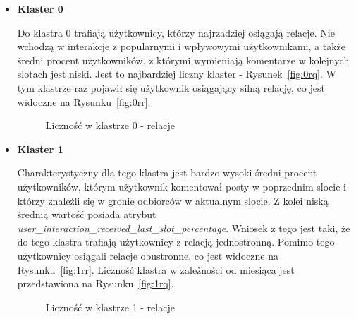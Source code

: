\documentclass[polish,12pt]{aghthesis}
\begin{document}
\begin{itemize}
    \item \textbf{Klaster 0}
    
    Do klastra 0 trafiają użytkownicy, którzy najrzadziej osiągają relacje. Nie wchodzą w interakcje z popularnymi i wpływowymi użytkownikami, a także średni procent użytkowników, z którymi wymieniają komentarze w kolejnych slotach jest niski. Jest to najbardziej liczny klaster - Rysunek~\ref{fig:0rq}. W tym klastrze raz pojawił się użytkownik osiągający silną relację, co jest widoczne na Rysunku~\ref{fig:0rr}.
    
            \begin{figure}[ht] 
    \centering
    \hfill%
    \caption{Liczność w klastrze 0 - relacje}
    \label{f:0r}
    \end{figure}
    

\item \textbf{Klaster 1}

Charakterystyczny dla tego klastra jest bardzo wysoki średni procent użytkowników, którym użytkownik komentował posty w poprzednim slocie i którzy znaleźli się w gronie odbiorców w aktualnym slocie. Z kolei niską średnią wartość posiada atrybut \textit{user\_interaction\_received\_last\_slot\_percentage}. Wniosek z tego jest taki, że do tego klastra trafiają użytkownicy z relacją jednostronną. Pomimo tego użytkownicy osiągali relacje obustronne, co jest widoczne na Rysunku~\ref{fig:1rr}. Liczność klastra w zależności od miesiąca jest przedstawiona na Rysunku~\ref{fig:1rq}.

            \begin{figure}[ht] 
    \centering
    \hfill%
    \caption{Liczność w klastrze 1 - relacje}
    \label{f:1r}
    \end{figure}




\end{itemize}
\end{document}
